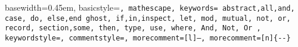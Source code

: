 { basewidth=0.45em,
  basicstyle=\scriptsize\tt,  %
  mathescape,
  keywords={
    abstract,all,and,
    case,
    do,
    else,end
    ghost,
    if,in,inspect,
    let,
    mod,
    mutual,
    not,
    or,
    record,
    section,some,
    then,
    type,
    use,
    where,
    And,
    Not,
    Or
  },
  keywordstyle=\color{blue},
  commentstyle=\color{brown},
  morecomment=[l]{--},
  morecomment=[n]{\{-}{-\}}
}

 {\lstset{language=alba}} {}
